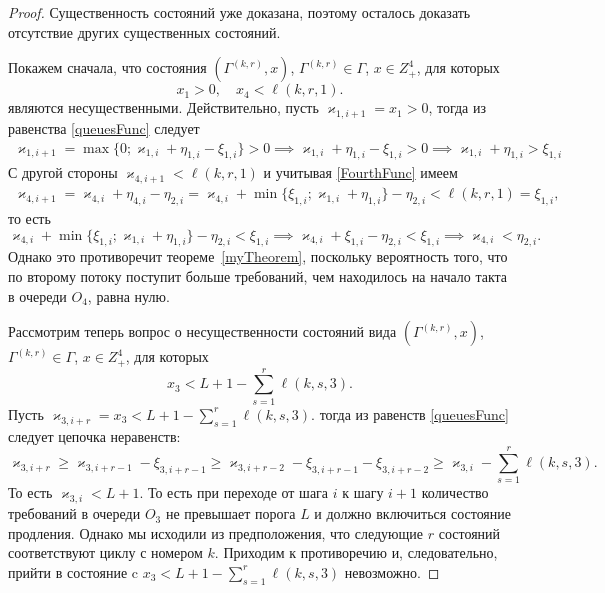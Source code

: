 \documentclass{report}
\begin{document}
\begin{proof}
Существенность состояний уже доказана, поэтому осталось доказать отсутствие других существенных состояний.

Покажем сначала, что состояния $(\Gamma^{(k,r)},x)$, $\Gamma^{(k,r)}\in \Gamma$, $x\in Z^4_+$, для которых 
\begin{equation*}
    x_1>0, \quad x_4 < \ell(k,r,1).
\end{equation*}
являются несущественными. Действительно, пусть $\varkappa_{1,i+1}=x_1 > 0$, тогда из равенства \eqref{queuesFunc} следует
\begin{multline*}
    \varkappa_{1,i+1} = \max \{0; \varkappa_{1,i} + \eta_{1,i}-\xi_{1,i}\} > 0 \implies \varkappa_{1,i} + \eta_{1,i}-\xi_{1,i} > 0 \implies  \varkappa_{1,i} + \eta_{1,i} > \xi_{1,i} 
\end{multline*}
С другой стороны $\varkappa_{4,i+1} < \ell(k,r,1)$ и учитывая \eqref{FourthFunc} имеем 
\begin{multline*}
    \varkappa_{4,i+1} = \varkappa_{4,i} + \eta_{4,i} - \eta_{2,i} =  \varkappa_{4,i} + \min\{\xi_{1,i}; \varkappa_{1,i}+\eta_{1,i}\} - \eta_{2,i}  < \ell(k,r,1) = \xi_{1,i},
\end{multline*}
то есть 
\begin{equation*}
     \varkappa_{4,i} + \min\{\xi_{1,i}; \varkappa_{1,i}+\eta_{1,i}\} - \eta_{2,i} < \xi_{1,i} \implies      \varkappa_{4,i} + \xi_{1,i}- \eta_{2,i} < \xi_{1,i} \implies  \varkappa_{4,i} < \eta_{2,i}.
\end{equation*}
Однако это противоречит теореме~\eqref{myTheorem}, поскольку вероятность того, что по второму потоку поступит больше требований, чем находилось на начало такта в очереди $O_4$, равна нулю.

Рассмотрим теперь вопрос о несущественности состояний вида $(\Gamma^{(k,r)},x)$, $\Gamma^{(k,r)}\in \Gamma$, $x\in Z^4_+$, для которых 
\begin{equation*}
    x_3< L + 1 - \sum_{s=1}^r \ell(k,s,3).
\end{equation*}
Пусть $\varkappa_{3,i+r}=x_3 < L + 1 - \sum_{s=1}^r \ell(k,s,3)$. тогда из равенств \eqref{queuesFunc} следует цепочка неравенств:
\begin{equation*}
    \varkappa_{3,i+r} \geqslant \varkappa_{3,i+r-1} - \xi_{3,i+r-1} \geqslant \varkappa_{3,i+r-2} - \xi_{3,i+r-1}- \xi_{3,i+r-2} \geqslant \varkappa_{3,i} - \sum_{s=1}^r \ell(k,s,3).
\end{equation*}
То есть $\varkappa_{3,i} < L + 1$. То есть при переходе от шага $i$ к шагу  $i+1$ количество требований в очереди $O_3$ не превышает порога $L$ и должно включиться состояние продления. Однако мы исходили из предположения, что следующие $r$ состояний соответствуют циклу с номером $k$. Приходим к противоречию и, следовательно, прийти в состояние c $x_3< L + 1 - \sum_{s=1}^r \ell(k,s,3)$ невозможно.

\end{proof}
\end{document}
